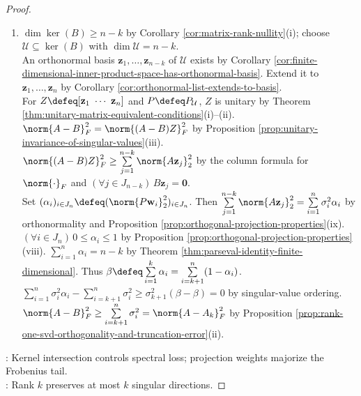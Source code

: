 \begin{theorem}
\begin{proof}
\begin{enumerate}[label=(\roman*)]
$\norm{A-B}_2\geq\norm{(A-B)\mathbf{x}}_2=\norm{A\mathbf{x}}_2\geq\sigma_{k+1}$ by $B\mathbf{x}=\mathbf{0}$, spectral-norm definition. $\sigma_{k+1}=\norm{A-A_k}_2$ by Proposition \ref{prop:rank-one-svd-orthogonality-and-truncation-error}(iii).
\item $\dim\ker(B)\geq n-k$ by Corollary \ref{cor:matrix-rank-nullity}(i); choose $\mathcal{U}\subseteq\ker(B)$ with $\dim\mathcal{U}=n-k$.\\
An orthonormal basis $\mathbf{z}_1,\ldots,\mathbf{z}_{n-k}$ of $\mathcal{U}$ exists by Corollary \ref{cor:finite-dimensional-inner-product-space-has-orthonormal-basis}. Extend it to $\mathbf{z}_1,\ldots,\mathbf{z}_n$ by Corollary \ref{cor:orthonormal-list-extends-to-basis}.\\
For $Z\defeq[\mathbf{z}_1\ \cdots\ \mathbf{z}_n]$ and $P\defeq P_{\mathcal{U}}$, $Z$ is unitary by Theorem \ref{thm:unitary-matrix-equivalent-conditions}(i)--(ii). $\norm{A-B}_F^2=\norm{(A-B)Z}_F^2$ by Proposition \ref{prop:unitary-invariance-of-singular-values}(iii).\\
$\norm{(A-B)Z}_F^2\geq\sum\limits_{j=1}^{n-k}\norm{A\mathbf{z}_j}_2^2$ by the column formula for $\norm{\cdot}_F$ and $(\forall j\in J_{n-k})\,B\mathbf{z}_j=\mathbf{0}$.\\
Set $(\alpha_i)_{i\in J_n}\defeq(\norm{P\mathbf{w}_i}_2^2)_{i\in J_n}$. Then $\sum\limits_{j=1}^{n-k}\norm{A\mathbf{z}_j}_2^2=\sum\limits_{i=1}^{n}\sigma_i^2\alpha_i$ by orthonormality and Proposition \ref{prop:orthogonal-projection-properties}(ix).\\
$(\forall i\in J_n)\,0\leq\alpha_i\leq1$ by Proposition \ref{prop:orthogonal-projection-properties}(viii). $\sum\limits_{i=1}^{n}\alpha_i=n-k$ by Theorem \ref{thm:parseval-identity-finite-dimensional}. Thus $\beta\defeq\sum\limits_{i=1}^{k}\alpha_i=\sum\limits_{i=k+1}^{n}(1-\alpha_i)$.\\
$\sum\limits_{i=1}^{n}\sigma_i^2\alpha_i-\sum\limits_{i=k+1}^{n}\sigma_i^2\geq\sigma_{k+1}^2(\beta-\beta)=0$ by singular-value ordering. $\norm{A-B}_F^2\geq\sum\limits_{i=k+1}^{n}\sigma_i^2=\norm{A-A_k}_F^2$ by Proposition \ref{prop:rank-one-svd-orthogonality-and-truncation-error}(ii).
\end{enumerate}
: Kernel intersection controls spectral loss; projection weights majorize the Frobenius tail.\\
: Rank $k$ preserves at most $k$ singular directions.
\end{proof}
\end{theorem}

